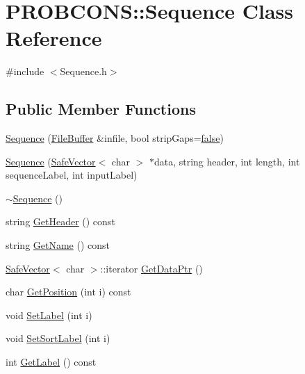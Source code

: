 \hypertarget{class_p_r_o_b_c_o_n_s_1_1_sequence}{\section{P\+R\+O\+B\+C\+O\+N\+S\+:\+:Sequence Class Reference}
\label{class_p_r_o_b_c_o_n_s_1_1_sequence}
}


{\ttfamily \#include $<$Sequence.\+h$>$}

\subsection*{Public Member Functions}
\begin{DoxyCompactItemize}
\item 
\hyperlink{class_p_r_o_b_c_o_n_s_1_1_sequence_a9801d0fba973339d9bab22e59ca5eac9}{Sequence} (\hyperlink{class_p_r_o_b_c_o_n_s_1_1_file_buffer}{File\+Buffer} \&infile, bool strip\+Gaps=\hyperlink{naview_8c_a65e9886d74aaee76545e83dd09011727}{false})
\item 
\hyperlink{class_p_r_o_b_c_o_n_s_1_1_sequence_acaaab4af7c958907f65e1380a9913c36}{Sequence} (\hyperlink{class_p_r_o_b_c_o_n_s_1_1_safe_vector}{Safe\+Vector}$<$ char $>$ $\ast$data, string header, int length, int sequence\+Label, int input\+Label)
\item 
\hyperlink{class_p_r_o_b_c_o_n_s_1_1_sequence_a9310a86e4003df91cabcb6b5f84395ac}{$\sim$\+Sequence} ()
\item 
string \hyperlink{class_p_r_o_b_c_o_n_s_1_1_sequence_a2696e70c9f86e3fb3baa8ace97f675a7}{Get\+Header} () const 
\item 
string \hyperlink{class_p_r_o_b_c_o_n_s_1_1_sequence_a12b45d448fcceb9c91e8a80fa35048b2}{Get\+Name} () const 
\item 
\hyperlink{class_p_r_o_b_c_o_n_s_1_1_safe_vector}{Safe\+Vector}$<$ char $>$\+::iterator \hyperlink{class_p_r_o_b_c_o_n_s_1_1_sequence_adb434994650702ccbe742a603d874bec}{Get\+Data\+Ptr} ()
\item 
char \hyperlink{class_p_r_o_b_c_o_n_s_1_1_sequence_a12af9505775abf0752141ef9f309b06f}{Get\+Position} (int i) const 
\item 
void \hyperlink{class_p_r_o_b_c_o_n_s_1_1_sequence_ad6067bb8d47b8a7e3959590f46b42840}{Set\+Label} (int i)
\item 
void \hyperlink{class_p_r_o_b_c_o_n_s_1_1_sequence_a5787f4c8c1baed6b62a8f6fd2bd74846}{Set\+Sort\+Label} (int i)
\item 
int \hyperlink{class_p_r_o_b_c_o_n_s_1_1_sequence_a9bbde5145481309d5ea40ad87d7fda22}{Get\+Label} () const 

\end{DoxyCompactItemize}
